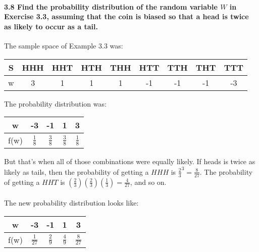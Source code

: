 \documentclass{article}
\begin{document}
\paragraph{3.8 Find the probability distribution of the random variable 
$W$ in Exercise 3.3, assuming that the coin is biased so that a head is 
twice as likely to occur as a tail.\\}
The sample space of Example 3.3 was:
\begin{center}
\begin{tabular}{c|c c c c c c c c}
S & HHH & HHT & HTH & THH & HTT & TTH & THT & TTT\\
\hline
w &  3  &  1  &  1  &  1  &  -1 &  -1 &  -1 &  -3
\end{tabular}
\end{center}
The probability distribution was:
\begin{center}
\begin{tabular}{c|c c c c}
w    &  -3         & -1          & 1           & 3\\
\hline
f(w) & $\frac{1}{8}$ & $\frac{3}{8}$ & $\frac{3}{8}$ & $\frac{1}{8}$
\end{tabular}
\end{center}
But that's when all of those combinations were equally likely.
If heads is twice as likely as tails, then the probability of getting
a $HHH$ is $\frac{2}{3}^3 = \frac{8}{27}$. The probability of getting
a $HHT$ is $\left(\frac{2}{3}\right)\left(\frac{2}{3}\right)
  \left(\frac{1}{3}\right) = \frac{4}{27}$, and so on.\\
\\
The new
probability distribution looks like:
\begin{center}
\begin{tabular}{|c|c c c c|}
\hline
w    &  -3         & -1          & 1           & 3\\
\hline
f(w) & $\frac{1}{27}$ & $\frac{2}{9}$ & $\frac{4}{9}$ & $\frac{8}{27}$\\
\hline
\end{tabular}
\end{center}

\pagebreak
\end{document}
